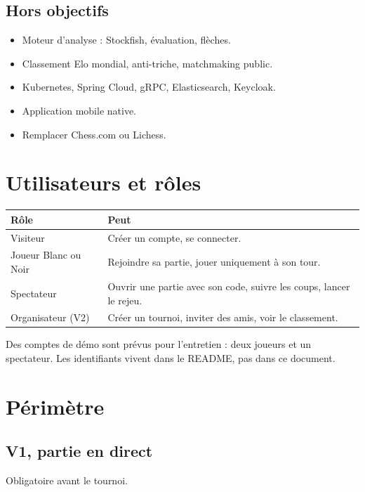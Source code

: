 \documentclass[11pt,a4paper]{article}
\begin{document}
\subsection{Hors objectifs}
\begin{itemize}
  \item Moteur d'analyse : Stockfish, évaluation, flèches.
  \item Classement Elo mondial, anti-triche, matchmaking public.
  \item Kubernetes, Spring Cloud, gRPC, Elasticsearch, Keycloak.
  \item Application mobile native.
  \item Remplacer Chess.com ou Lichess.
\end{itemize}

\section{Utilisateurs et rôles}

\begin{tabularx}{\linewidth}{@{}Y L@{}}
\toprule
Rôle & Peut \\
\midrule
Visiteur & Créer un compte, se connecter. \\
Joueur Blanc ou Noir & Rejoindre sa partie, jouer uniquement à son tour. \\
Spectateur & Ouvrir une partie avec son code, suivre les coups, lancer le rejeu. \\
Organisateur (V2) & Créer un tournoi, inviter des amis, voir le classement. \\
\bottomrule
\end{tabularx}

Des comptes de démo sont prévus pour l'entretien : deux joueurs et un spectateur. Les identifiants vivent dans le README, pas dans ce document.

\section{Périmètre}

\subsection{V1, partie en direct}
Obligatoire avant le tournoi.
\end{document}
